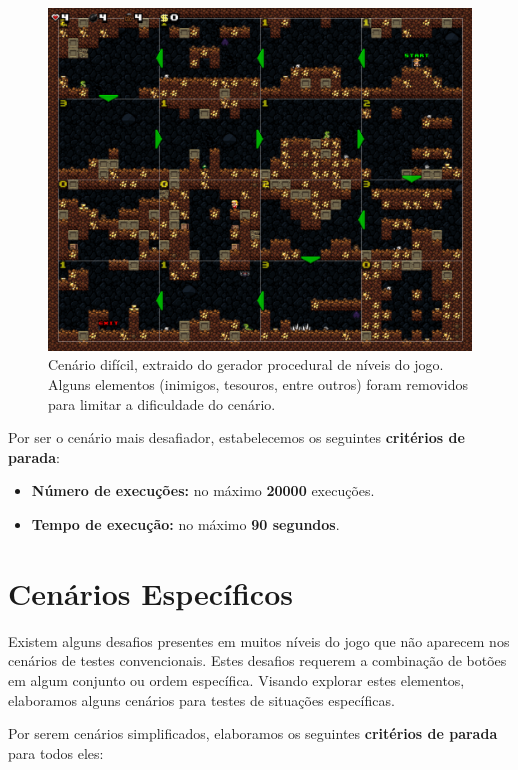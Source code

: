 \begin{figure}[H]
\centering
\includegraphics[width=\textwidth / 2]{fig/levels/level3.pdf}
\caption{Cenário difícil, extraido do gerador procedural de níveis do jogo.
	Alguns elementos (inimigos, tesouros, entre outros) foram removidos para
	limitar a dificuldade do cenário.}
\label{fig:level3}
\end{figure}


Por ser o cenário mais desafiador, estabelecemos os seguintes \textbf{critérios
de parada}:

\begin{itemize}
	\item \textbf{Número de execuções:} no máximo \textbf{20000} execuções.
	\item \textbf{Tempo de execução:} no máximo \textbf{90 segundos}.
\end{itemize}


\section{Cenários Específicos}

Existem alguns desafios presentes em muitos níveis do jogo que não aparecem nos
cenários de testes convencionais. Estes desafios requerem a combinação de botões
em algum conjunto ou ordem específica. Visando explorar estes elementos,
elaboramos alguns cenários para testes de situações específicas.

Por serem cenários simplificados, elaboramos os seguintes \textbf{critérios de
parada} para todos eles:

